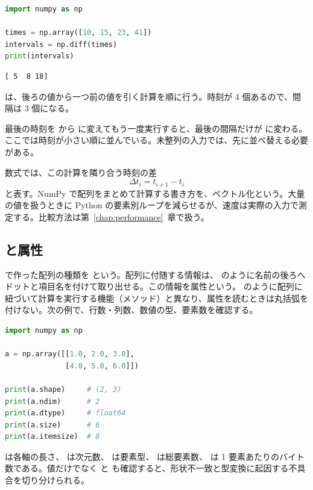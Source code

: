 \begin{lstlisting}[language=Python]
import numpy as np

times = np.array([10, 15, 23, 41])
intervals = np.diff(times)
print(intervals)
\end{lstlisting}

\begin{lstlisting}[numbers=none, xleftmargin=2\zw]
[ 5  8 18]
\end{lstlisting}

 は、後ろの値から一つ前の値を引く計算を順に行う。時刻が 4 個あるので、間隔は 3 個になる。

最後の時刻を  から  に変えてもう一度実行すると、最後の間隔だけが  に変わる。ここでは時刻が小さい順に並んでいる。未整列の入力では、先に並べ替える必要がある。

数式では、この計算を隣り合う時刻の差
\[
\Delta t_i = t_{i+1} - t_i
\]
と表す。NumPy で配列をまとめて計算する書き方を、ベクトル化という。大量の値を扱うときに Python の要素別ループを減らせるが、速度は実際の入力で測定する。比較方法は第~\ref{chap:performance}~章で扱う。

\subsection{ と属性}

 で作った配列の種類を  という。配列に付随する情報は、 のように名前の後ろへドットと項目名を付けて取り出せる。この情報を属性という。 のように配列に紐づいて計算を実行する機能（メソッド）と異なり、属性を読むときは丸括弧を付けない。次の例で、行数・列数、数値の型、要素数を確認する。

\begin{lstlisting}[language=Python]
import numpy as np

a = np.array([[1.0, 2.0, 3.0],
              [4.0, 5.0, 6.0]])

print(a.shape)     # (2, 3)
print(a.ndim)      # 2
print(a.dtype)     # float64
print(a.size)      # 6
print(a.itemsize)  # 8
\end{lstlisting}

 は各軸の長さ、 は次元数、 は要素型、 は総要素数、 は 1 要素あたりのバイト数である。値だけでなく  と  も確認すると、形状不一致と型変換に起因する不具合を切り分けられる。

